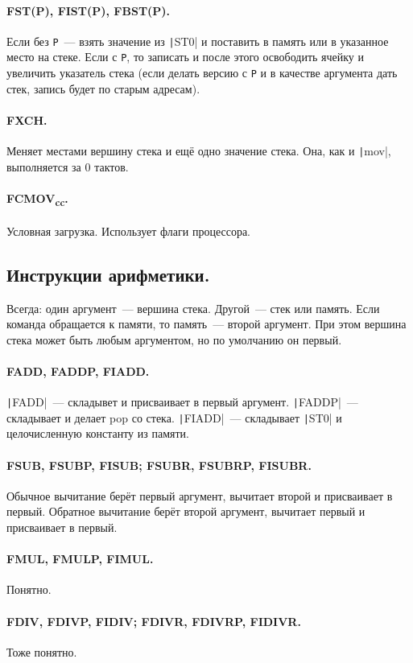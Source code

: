 \documentclass{article}
\begin{document}
    \paragraph{FST(P), FIST(P), FBST(P).}
    Если без \Verb|P|~--- взять значение из \texttt|ST0| и поставить в память или в указанное место на стеке. Если с \Verb|P|, то записать и после этого освободить ячейку и увеличить указатель стека (если делать версию с \Verb|P| и в качестве аргумента дать стек, запись будет по старым адресам).
    \paragraph{FXCH.}
    Меняет местами вершину стека и ещё одно значение стека. Она, как и \texttt|mov|, выполняется за 0 тактов.
    \paragraph{FCMOV\textsubscript{cc}.}
    Условная загрузка. Использует флаги процессора.
    \subsection{Инструкции арифметики.}
    Всегда: один аргумент~--- вершина стека. Другой~--- стек или память. Если команда обращается к памяти, то память~--- второй аргумент. При этом вершина стека может быть любым аргументом, но по умолчанию он первый.
    \paragraph{FADD, FADDP, FIADD.}
    \texttt|FADD|~--- складывет и присваивает в первый аргумент. \texttt|FADDP|~--- складывает и делает pop со стека. \texttt|FIADD|~--- складывает \texttt|ST0| и целочисленную константу из памяти.
    \paragraph{FSUB, FSUBP, FISUB; FSUBR, FSUBRP, FISUBR.}
    Обычное вычитание берёт первый аргумент, вычитает второй и присваивает в первый. Обратное вычитание берёт второй аргумент, вычитает первый и присваивает в первый.
    \paragraph{FMUL, FMULP, FIMUL.}
    Понятно.
    \paragraph{FDIV, FDIVP, FIDIV; FDIVR, FDIVRP, FIDIVR.}
    Тоже понятно.
\end{document}
